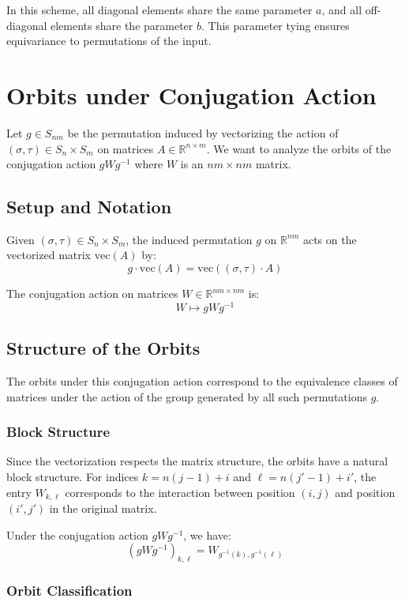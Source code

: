 \documentclass[11pt]{article}
\begin{document}
\noindent
In this scheme, all diagonal elements share the same parameter $a$, and all off-diagonal elements share the parameter $b$. This parameter tying ensures equivariance to permutations of the input.

\section{Orbits under Conjugation Action}

Let $g \in S_{nm}$ be the permutation induced by vectorizing the action of $(\sigma, \tau) \in S_n \times S_m$ on matrices $A \in \mathbb{R}^{n \times m}$. We want to analyze the orbits of the conjugation action $g W g^{-1}$ where $W$ is an $nm \times nm$ matrix.

\subsection{Setup and Notation}

Given $(\sigma, \tau) \in S_n \times S_m$, the induced permutation $g$ on $\mathbb{R}^{nm}$ acts on the vectorized matrix $\mathrm{vec}(A)$ by:
\[
g \cdot \mathrm{vec}(A) = \mathrm{vec}((\sigma, \tau) \cdot A)
\]

The conjugation action on matrices $W \in \mathbb{R}^{nm \times nm}$ is:
\[
W \mapsto g W g^{-1}
\]

\subsection{Structure of the Orbits}

The orbits under this conjugation action correspond to the equivalence classes of matrices under the action of the group generated by all such permutations $g$.

\subsubsection{Block Structure}

Since the vectorization respects the matrix structure, the orbits have a natural block structure. For indices $k = n(j-1) + i$ and $\ell = n(j'-1) + i'$, the entry $W_{k,\ell}$ corresponds to the interaction between position $(i,j)$ and position $(i',j')$ in the original matrix.

Under the conjugation action $g W g^{-1}$, we have:
\[
(g W g^{-1})_{k,\ell} = W_{g^{-1}(k), g^{-1}(\ell)}
\]

\subsubsection{Orbit Classification}
\end{document}
